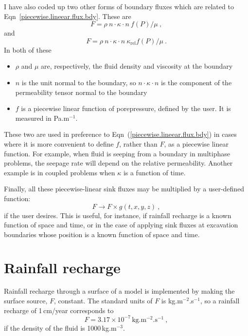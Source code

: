 \documentclass[]{scrreprt}
\begin{document}
I have also coded up two other forms of
boundary fluxes which are related to
Eqn~\ref{piecewise.lineear.flux.bdy}.  These are
\begin{equation}
F = \rho\ n\cdot\kappa\cdot n \ f(P)/\mu \ ,
\end{equation}
and
\begin{equation}
F = \rho \ n\cdot\kappa\cdot n\ \kappa_{\mathrm{rel}} f(P)/\mu \ .
\end{equation}
In both of these
\begin{itemize}
\item $\rho$ and $\mu$ are, respectively, the fluid density and
  viscosity at the boundary
\item $n$ is the unit normal to the boundary, so $n \cdot \kappa \cdot
  n$ is the component of the permeability tensor normal to the
  boundary
\item $f$ is a piecewise linear function of porepressure, defined by
  the user.  It is measured in Pa.m$^{-1}$.
\end{itemize}
These two are used in preference to
Eqn~(\ref{piecewise.lineear.flux.bdy}) in cases where it is more
convenient to define $f$, rather than $F$, as a piecewise linear
function.  For example, when fluid is seeping from a boundary in
multiphase problems, the seepage rate will depend on the relative
permeability.  Another example is in coupled problems when $\kappa$ is
a function of time.

Finally, all these piecewise-linear sink fluxes may be multiplied by a
user-defined function: 
\begin{equation}
F \rightarrow F\times g(t, x, y, z) \ ,
\end{equation}
if the user desires.  This is useful, for instance, if rainfall
recharge is a known function of space and time, or in the case of
applying sink fluxes at excavation boundaries whose position is a
known function of space and time.





\section{Rainfall recharge}
\label{rainfall.recharge.sec}

Rainfall recharge through a surface of a model is implemented by
making the surface source, $F$, constant.  The standard
units of $F$ is kg.m$^{-2}$.s$^{-1}$, so a rainfall recharge of
1\,cm/year corresponds to
\begin{equation}
F = 3.17\times 10^{-7}\,\mbox{kg.m$^{-2}$.s$^{-1}$} \ ,
\end{equation}
if the density of the fluid is 1000\,kg.m$^{-3}$.
\end{document}
